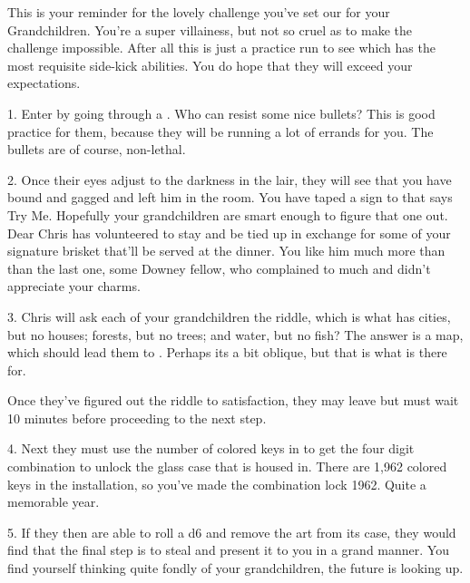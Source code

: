 \documentclass[green]{LRSguildcamp1}
\begin{document}
\name{\gGrandmasChallenge{}}

This is your reminder for the lovely challenge you've set our for your Grandchildren. You're a super villainess, but not so cruel as to make the challenge impossible. After all this is just a practice run to see which has the most requisite side-kick abilities. You do hope that they will exceed your expectations. 

1. Enter \pGrandmasLair{} by going through a \sBullets{}. Who can resist some nice bullets? This is good practice for them, because they will be running a lot of errands for you. The bullets are of course, non-lethal. 


2. Once their eyes adjust to the darkness in the lair, they will see that you have bound and gagged \cChrisHemsworth{} and left him in the room. You have taped a sign to \cChrisHemsworth{} that says Try Me. Hopefully your grandchildren are smart enough to figure that one out. Dear Chris has volunteered to stay and be tied up in exchange for some of your signature brisket that'll be served at the dinner. You like him much more than than the last one, some Downey fellow,  who complained to much and didn't appreciate your charms. 


3. Chris will ask each of your grandchildren the riddle, which is what has cities, but no houses; forests, but no trees; and water, but no fish? The answer is a map, which should lead them to \iArtworkThree{}. Perhaps its a bit oblique, but that is what \cChrisHemsworth{} is there for. 

Once they've figured out the riddle to \cChrisHemsworth{} satisfaction, they may leave but must wait 10 minutes before proceeding to the next step. 

4. Next they must use the number of colored keys in \iArtworkThree{} to get the four digit combination to unlock the glass case that \iArtworkThree{} is housed in. There are 1,962 colored keys in the installation, so you've made the combination lock 1962. Quite a memorable year.  


5. If they then are able to roll a d6 and remove the art from its case, they would find that the final step is to steal \cOS{} \iBagofHolding{} and present it to you in a grand manner. You find yourself thinking quite fondly of your grandchildren, the future is looking up. 
\end{document}
